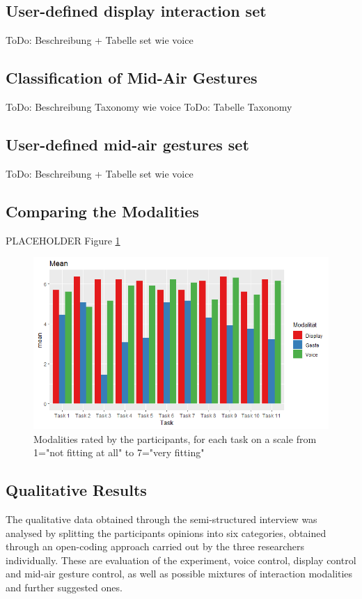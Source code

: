 \documentclass[sigchi]{acmart}
\begin{document}
	\subsection{User-defined display interaction set}
	ToDo: Beschreibung + Tabelle set wie voice
	\subsection{Classification of Mid-Air Gestures}
	ToDo: Beschreibung Taxonomy wie voice
	ToDo: Tabelle Taxonomy
	\subsection{User-defined mid-air gestures set}
	ToDo: Beschreibung + Tabelle set wie voice
	
	\subsection{Comparing the Modalities}
	PLACEHOLDER Figure \ref{figure:ModalityRating}
	\begin{figure}			
		\centering
		\includegraphics[width=\columnwidth]{MeanGesamt}
		\caption{Modalities rated by the participants, for each task on a scale from 1="not fitting at all" to 7="very fitting"}
		\label{figure:ModalityRating}
	\end{figure}
	
	\subsection{Qualitative Results}
	The qualitative data obtained through the semi-structured interview was analysed by splitting the participants opinions into six categories, obtained through an open-coding approach carried out by the three researchers individually. These are evaluation of the experiment, voice control, display control and mid-air gesture control, as well as possible mixtures of interaction modalities and further suggested ones. 
	
\end{document}
